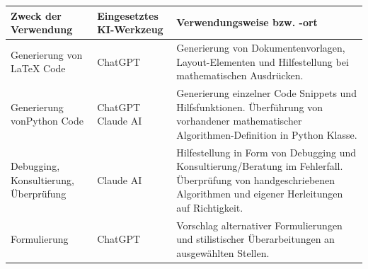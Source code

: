 \documentclass[12pt,a4paper]{article}
\begin{document}
\begin{table}[ht]
	\centering
	\renewcommand{\arraystretch}{1.4}
	\begin{tabular}{|p{}|p{}|p{}|}
		\hline
		\textbf{Zweck der \newline Verwendung} &
		\textbf{Eingesetztes \newline KI-Werkzeug} &
		\textbf{Verwendungsweise bzw. -ort} \\
		\hline
		
		Generierung von LaTeX Code &
		ChatGPT &
		Generierung von Dokumentenvorlagen, Layout-Elementen und Hilfestellung bei mathematischen Ausdrücken. \\
		\hline
		
		Generierung von\newline Python Code &
		ChatGPT \newline Claude AI &
		Generierung einzelner Code Snippets und Hilfsfunktionen. Überführung von vorhandener mathematischer Algorithmen-Definition in Python Klasse. \\
		\hline
		
		Debugging, \newline Konsultierung, \newline Überprüfung &
		Claude AI &
		Hilfestellung in Form von Debugging und Konsultierung/Beratung im Fehlerfall. Überprüfung von handgeschriebenen Algorithmen und eigener Herleitungen auf \newline Richtigkeit.\\
		\hline
		
		Formulierung &
		ChatGPT &
		Vorschlag alternativer Formulierungen und stilistischer Überarbeitungen an ausgewählten \newline Stellen. \\
		\hline
		
	\end{tabular}
\end{table}
\end{document}
